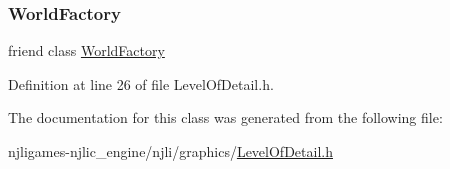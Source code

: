 \subsubsection{\texorpdfstring{World\+Factory}{WorldFactory}}
{\footnotesize\ttfamily friend class \mbox{\hyperlink{classnjli_1_1_world_factory}{World\+Factory}}\hspace{0.3cm}{\ttfamily [friend]}}



Definition at line 26 of file Level\+Of\+Detail.\+h.



The documentation for this class was generated from the following file\+:\begin{DoxyCompactItemize}
\item 
njligames-\/njlic\+\_\+engine/njli/graphics/\mbox{\hyperlink{_level_of_detail_8h}{Level\+Of\+Detail.\+h}}\end{DoxyCompactItemize}
